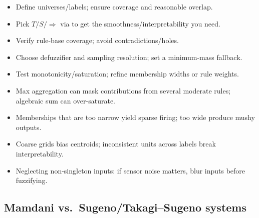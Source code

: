 \begin{tcolorbox}[summarybox, title={Design checklist}]
\begin{itemize}
    \item Define universes/labels; ensure coverage and reasonable overlap.
    \item Pick \(T/S/\Rightarrow\) via  to get the smoothness/interpretability you need.
    \item Verify rule-base coverage; avoid contradictions/holes.
    \item Choose defuzzifier and sampling resolution; set a minimum-mass fallback.
    \item Test monotonicity/saturation; refine membership widths or rule weights.
\end{itemize}
\end{tcolorbox}

\begin{tcolorbox}[pitfallbox, title={Common pitfalls}]
\begin{itemize}
    \item Max aggregation can mask contributions from several moderate rules; algebraic sum can over-saturate.
    \item Memberships that are too narrow yield sparse firing; too wide produce mushy outputs.
    \item Coarse grids bias centroids; inconsistent units across labels break interpretability.
    \item Neglecting non-singleton inputs: if sensor noise matters, blur inputs before fuzzifying.
\end{itemize}
\end{tcolorbox}

\subsection{Mamdani vs.\ Sugeno/Takagi--Sugeno systems}
\label{sec:fuzzyinference_mamdani_vs_sugeno_takagi_sugeno_systems}


